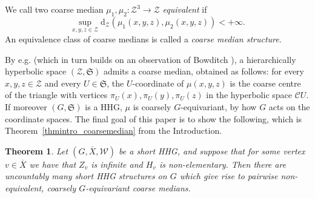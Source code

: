 \documentclass[svgnames]{amsart}
\theoremstyle{plain}
\newtheorem{thm}{Theorem}[section]
\theoremstyle{definition}
\newcommand{\frakS}{\mathfrak S}
\newcommand{\C}{\mathcal C}
\newcommand{\ov}[1]{\overline{#1}}
\newcommand{\dist}{\mathrm{d}}
\newcommand{\cuco}[1]{{\mathcal #1}}
\newcommand{\W}{\mathcal{W}}
\begin{document}
We call two coarse median $\mu_1,\mu_2\colon \cuco Z^3\to \cuco Z$  \emph{equivalent} if $$\sup_{x,y,z\in \cuco Z} \dist_{\cuco Z}(\mu_1(x,y,z),\mu_2(x,y,z))<+\infty.$$
An equivalence class of coarse medians is called a \emph{coarse median structure}. 

By e.g. \cite[Theorem 7.3]{HHS_II} (which in turn builds on an observation of Bowditch \cite{bowditch_mcg}), a hierarchically hyperbolic space $(\cuco Z,\frakS)$ admits a coarse median, obtained as follows: for every $x,y,z\in \cuco Z$ and every $U\in\frakS$, the $U$-coordinate of $\mu(x,y,z)$ is the coarse centre of the triangle with vertices $\pi_U(x), \pi_U(y),\pi_U(z)$ in the hyperbolic space $\C U$. If moreover $(G,\frakS)$ is a HHG, $\mu$ is coarsely $G$-equivariant, by how $G$ acts on the coordinate spaces. The final goal of this paper is to show the following, which is Theorem~\ref{thmintro_coarsemedian} from the Introduction.

\begin{thm}\label{thm:coarse_median}
    Let $(G, \ov X, \W)$ be a short HHG, and suppose that for some vertex $v\in \ov X$ we have that $Z_v$ is infinite and $H_v$ is non-elementary. Then there are uncountably many short HHG structures on $G$ which give rise to pairwise non-equivalent, coarsely $G$-equivariant coarse medians.
\end{thm}
\end{document}
